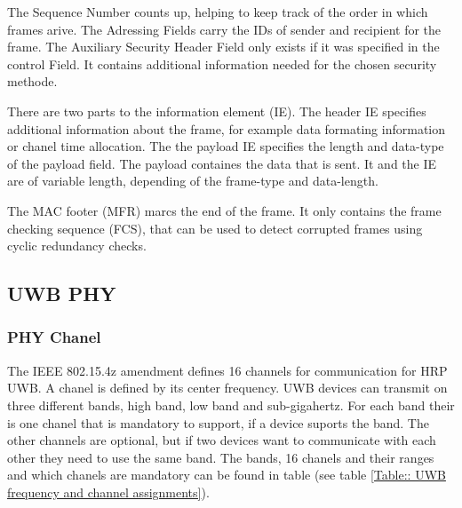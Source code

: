 The Sequence Number counts up, helping to keep track of the order in which frames arive.
The Adressing Fields carry the IDs of sender and recipient for the frame.
The Auxiliary Security Header Field only exists if it was specified in the control Field.
It contains additional information needed for the chosen security methode.

There are two parts to the information element (IE).
The header IE specifies additional information about the frame, for example data formating information or chanel time allocation.
The the payload IE specifies the length and data-type of the payload field.
The payload containes the data that is sent.
It and the IE are of variable length, depending of the frame-type and data-length.

The MAC footer (MFR) marcs the end of the frame.
It only contains the frame checking sequence (FCS), that can be used to detect corrupted frames using cyclic redundancy checks.

\subsection{UWB PHY}

\subsubsection{PHY Chanel}

The IEEE 802.15.4z amendment defines 16 channels for communication for HRP UWB. 
A chanel is defined by its center frequency.
UWB devices can transmit on three different bands, high band, low band and sub-gigahertz.
For each band their is one chanel that is mandatory to support, if a device suports the band.
The other channels are optional, but if two devices want to communicate with each other they need to use the same band.
The bands, 16 chanels and their ranges and which chanels are mandatory can be found in table  (see table \ref{Table:: UWB frequency and channel assignments}).


